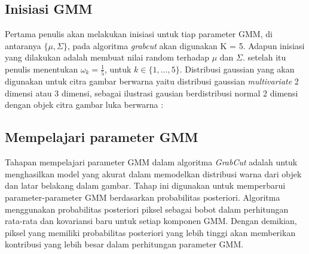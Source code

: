 \subsection{Inisiasi GMM}

Pertama penulis akan melakukan inisiasi untuk tiap parameter GMM, di antaranya 
\(\{\mu, \Sigma \}\), pada algoritma \emph{grabcut} akan digunakan K = 5. Adapun
inisiasi yang dilakukan adalah membuat nilai random terhadap \(\mu\) dan \(\Sigma\).
setelah itu penulis menentukan \(\omega_k = \frac{1}{5}\), untuk \(k \in \{1, ..., 5\}\).
Distribusi gaussian yang akan digunakan untuk citra gambar berwarna yaitu distribusi 
gaussian \emph{multivariate} 2 dimensi atau 3 dimensi, sebagai ilustrasi gausian berdistribusi 
normal 2 dimensi dengan objek citra gambar luka berwarna :


\subsection{Mempelajari parameter GMM}

Tahapan mempelajari parameter GMM dalam algoritma \emph{GrabCut} adalah untuk 
menghasilkan model yang akurat dalam memodelkan distribusi warna dari objek 
dan latar belakang dalam gambar. Tahap ini digunakan untuk memperbarui parameter-parameter 
GMM berdasarkan probabilitas posteriori. Algoritma menggunakan probabilitas posteriori 
piksel sebagai bobot dalam perhitungan rata-rata dan kovariansi baru untuk setiap 
komponen GMM. Dengan demikian, piksel yang memiliki probabilitas posteriori yang 
lebih tinggi akan memberikan kontribusi yang lebih besar dalam perhitungan parameter GMM.

